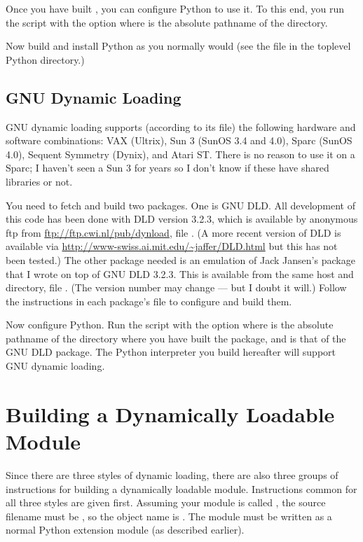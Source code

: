 \documentclass[twoside,openright]{report}
\begin{document}
Once you have built , you can configure Python to use it.  To
this end, you run the  script with the option
 where  is the absolute
pathname of the  directory.

Now build and install Python as you normally would (see the
 file in the toplevel Python directory.)

\subsection{GNU Dynamic Loading}

GNU dynamic loading supports (according to its  file) the
following hardware and software combinations: VAX (Ultrix), Sun 3
(SunOS 3.4 and 4.0), Sparc (SunOS 4.0), Sequent Symmetry (Dynix), and
Atari ST.  There is no reason to use it on a Sparc; I haven't seen a
Sun 3 for years so I don't know if these have shared libraries or not.

You need to fetch and build two packages.
One is GNU DLD.  All development of this code has been done with DLD
version 3.2.3, which is available by anonymous ftp from
\url{ftp://ftp.cwi.nl/pub/dynload}, file
.  (A more recent version of DLD is available
via \url{http://www-swiss.ai.mit.edu/~jaffer/DLD.html} but this has
not been tested.)
The other package needed is an
emulation of Jack Jansen's  package that I wrote on top of
GNU DLD 3.2.3.  This is available from the same host and directory,
file .  (The version number may change --- but I doubt
it will.)  Follow the instructions in each package's 
file to configure and build them.

Now configure Python.  Run the  script with the option
 where
 is the absolute pathname of the directory where you
have built the  package, and  is that
of the GNU DLD package.  The Python interpreter you build hereafter
will support GNU dynamic loading.


\section{Building a Dynamically Loadable Module}

Since there are three styles of dynamic loading, there are also three
groups of instructions for building a dynamically loadable module.
Instructions common for all three styles are given first.  Assuming
your module is called , the source filename must be
, so the object name is .  The
module must be written as a normal Python extension module (as
described earlier).
\end{document}
